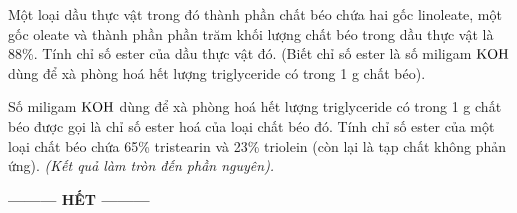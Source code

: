 \documentclass[12pt,a4paper]{article}
\begin{document}
\begin{ex}
Một loại dầu thực vật trong đó thành phần chất béo chứa hai gốc linoleate, một gốc oleate và thành phần phần trăm khối lượng chất béo trong dầu thực vật là 88\%. Tính chỉ số ester của dầu thực vật đó. (Biết chỉ số ester là số miligam $\ce{KOH}$ dùng để xà phòng hoá hết lượng triglyceride có trong 1 g chất béo).
\loigiai{}
\end{ex}

\begin{ex}
Số miligam $\ce{KOH}$ dùng để xà phòng hoá hết lượng triglyceride có trong 1 g chất béo được gọi là chỉ số ester hoá của loại chất béo đó. Tính chỉ số ester của một loại chất béo chứa 65\% tristearin và 23\% triolein (còn lại là tạp chất không phản ứng). \textit{(Kết quả làm tròn đến phần nguyên).}
\loigiai{}
\end{ex}

\begin{center}
\textbf{--------- HẾT ---------}
\end{center}
\end{document}
